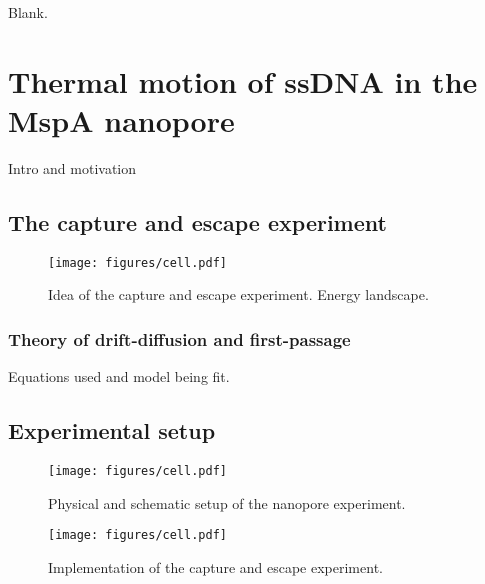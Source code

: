\begin{savequote}[75mm]
Blank.
\end{savequote}

\chapter{Thermal motion of ssDNA in the MspA nanopore}
\label{dna_thermal_motion_mspa}

Intro and motivation

\section{The capture and escape experiment}

\begin{figure}[h]
\begin{centering}
\texttt{[image: figures/cell.pdf]}
\caption[Capture and escape theory]{Idea of the capture and escape experiment.  Energy landscape.}
\label{fig:capture_escape_theory}
\end{centering}
\end{figure}

\subsection{Theory of drift-diffusion and first-passage}

Equations used and model being fit.

\section{Experimental setup}

\begin{figure}[h]
\begin{centering}
\texttt{[image: figures/cell.pdf]}
\caption[Experimental setup]{Physical and schematic setup of the nanopore experiment.}
\label{fig:experiment_setup}
\end{centering}
\end{figure}

\begin{figure}[h]
\begin{centering}
\texttt{[image: figures/cell.pdf]}
\caption[Capture and escape experiment schematically]{Implementation of the capture and escape experiment.}
\label{fig:capture_escape_experiment}
\end{centering}
\end{figure}

